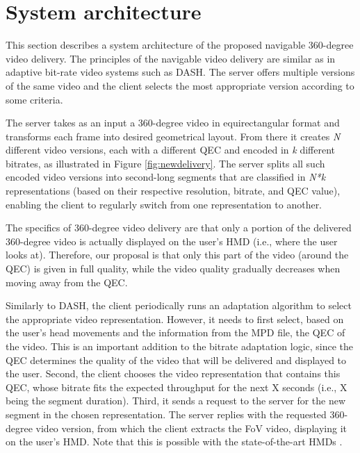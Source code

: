 

\section{System architecture}

This section describes a system architecture of the proposed navigable 360-degree video delivery. The principles of the navigable video delivery are similar as in adaptive bit-rate
video systems such as \ac{DASH}\cite{Stockhammer11}. The server offers multiple versions of the same video
and the client selects the most appropriate version according to some criteria. %

The server takes as an input a 360-degree video in equirectangular format and transforms each frame into desired geometrical layout. From there it creates \textit{N} different video versions, each with a different QEC and encoded in \textit{k} different bitrates, as illustrated in Figure \ref{fig:newdelivery}. The server splits all such encoded video versions into second-long segments that are classified in \textit{N*k} representations (based on their respective resolution, bitrate, and QEC value), enabling the client to regularly switch from one representation to another.

The specifics of 360-degree video delivery are that only a portion of the delivered 360-degree video is actually displayed on the user's HMD (i.e., where the user looks at). Therefore, our proposal is that only this part of the video (around the QEC) is given in full quality, while the video quality gradually decreases when moving away from the QEC.

Similarly to DASH, the client periodically runs an adaptation algorithm to select the appropriate video representation. However, it needs to first select, based on the user's head movements and the information from the MPD file, the QEC of the video. This is an important addition to the bitrate adaptation logic, since the QEC determines the quality of the video that will be delivered and displayed to the user. Second, the client chooses the video representation that contains this QEC, whose bitrate fits the expected throughput for the next X seconds (i.e., X being the segment duration). Third, it sends a request to the server for the new segment in the chosen representation. The server replies with the requested 360-degree video version, from which the client extracts the FoV video, displaying it on the user's HMD. Note that this is possible with the state-of-the-art HMDs \cite{}.

